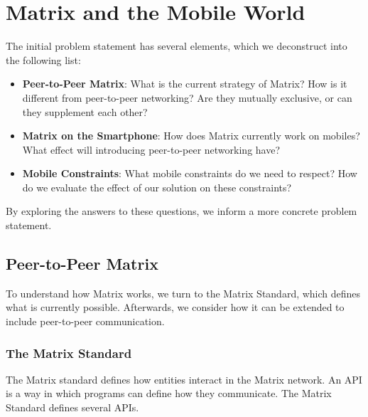 \chapter{Matrix and the Mobile World}
The initial problem statement has several elements, which we deconstruct into the following list:
\begin{itemize}
	\item{
	      \textbf{Peer-to-Peer Matrix}:
	      What is the current strategy of Matrix?
	      How is it different from peer-to-peer networking?
	      Are they mutually exclusive, or can they supplement each other?
	      }
	\item{
	      \textbf{Matrix on the Smartphone}:
	      How does Matrix currently work on mobiles?
	      What effect will introducing peer-to-peer networking have?
	      }
	\item{
	      \textbf{Mobile Constraints}:
	      What mobile constraints do we need to respect?
	      How do we evaluate the effect of our solution on these constraints?
	      }
\end{itemize}

By exploring the answers to these questions, we inform a more concrete problem statement.

\section{Peer-to-Peer Matrix}
To understand how Matrix works, we turn to the Matrix Standard, which defines what is currently possible.
Afterwards, we consider how it can be extended to include peer-to-peer communication.

\subsection{The Matrix Standard}
The Matrix standard defines how entities interact in the Matrix network.
An \ac{API} is a way in which programs can define how they communicate.
The Matrix Standard defines several \ac{API}s.

